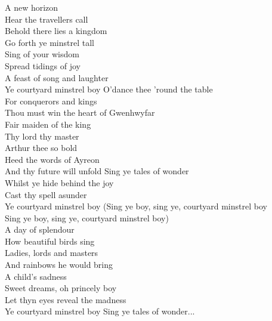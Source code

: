 A new horizon \tab{}\tab{}\\
Hear the travellers call\tab{}\\
Behold there lies a kingdom\tab{}\\
Go forth ye minstrel tall\tab{}\\
Sing of your wisdom\tab{}\\
Spread tidings of joy\tab{}\\
A feast of song and laughter\tab{}\\
Ye courtyard minstrel boy\tab{}
\hops
O'dance thee 'round the table\\
For conquerors and kings\\
Thou must win the heart of Gwenhwyfar\\
Fair maiden of the king\\
Thy lord thy master\\
Arthur thee so bold\\
Heed the words of Ayreon\\
And thy future will unfold
\hops
{} Sing ye tales of wonder\tab{}\\
 Whilst ye hide behind the joy\\
 Cast thy spell asunder\tab{}\\
 Ye courtyard minstrel boy\tab{}
\hops
{} (Sing ye boy, sing ye, courtyard minstrel boy\\
 Sing ye boy, sing ye, courtyard minstrel boy)\\
\hops
A day of splendour\\
How beautiful birds sing\\
Ladies, lords and masters\\
And rainbows he would bring\\
A child's sadness\\
Sweet dreams, oh princely boy\\
Let thyn eyes reveal the madness\\
Ye courtyard minstrel boy
\hops
{} Sing ye tales of wonder...

